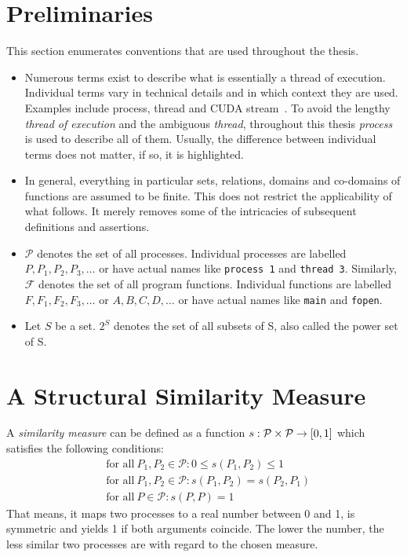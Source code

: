 \documentclass[a4paper, final, diplominf]{zih-template}
\begin{document}
\section{Preliminaries}
\label{sec:new-preliminaries}
This section enumerates conventions that are used throughout the thesis.
\begin{itemize}
	\item Numerous terms exist to describe what is essentially a thread of execution.
		Individual terms vary in technical details and in which context they are used.
		Examples include process, thread and CUDA stream~\cite{cuda}.
		To avoid the lengthy \emph{thread of execution} and the ambiguous \emph{thread}, throughout this thesis \emph{process} is used to describe all of them.\vspace{-0.5ex}
		Usually, the difference between individual terms does not matter, if so, it is highlighted.
	\item In general, everything in particular sets, relations, domains and co-domains of functions are assumed to be finite.
		This does not restrict the applicability of what follows.
		It merely removes some of the intricacies of subsequent definitions and assertions.\vspace{-0.5ex}
	\item $\mathcal{P}$ denotes the set of all processes.
		Individual processes are labelled $P, P_1, P_2, P_3, \ldots$ or have actual names like \texttt{process~1} and \texttt{thread~3}.
		Similarly, $\mathcal{F}$ denotes the set of all program functions.
		Individual functions are labelled $F, F_1, F_2, F_3, \ldots$ or $A, B, C, D, \ldots$ or have actual names like \texttt{main} and \texttt{fopen}.\vspace{-0.5ex}
	\item Let $S$ be a set. $2^S$ denotes the set of all subsets of S, also called the power set of S.
\end{itemize}

\section{A Structural Similarity Measure}
\label{sec:new-structural}
A \emph{similarity measure} can be defined as a function $s : \mathcal{P} \times\nobreak \mathcal{P} \to \mathopen[ 0, 1 \mathclose]$ which satisfies the following conditions:
\begin{equation*}
	\begin{aligned}
		& \text{for all}~P_1, P_2 \in \mathcal{P} : 0 \le s(P_1, P_2) \le 1 \\
		& \text{for all}~P_1, P_2 \in \mathcal{P} : s(P_1, P_2) = s(P_2, P_1) \\
		& \text{for all}~P \in \mathcal{P} : s(P, P) = 1
	\end{aligned}
\end{equation*}
That means, it maps two processes to a real number between 0 and 1, is symmetric and yields 1 if both arguments coincide.
The lower the number, the less similar two processes are with regard to the chosen measure.
\end{document}
